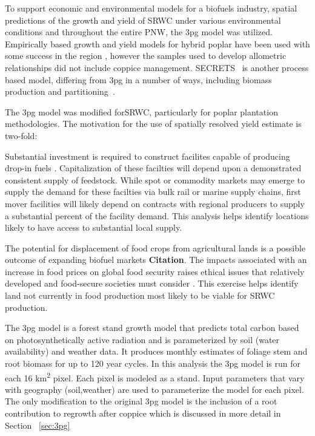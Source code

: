 \documentclass[preprint,12pt]{elsarticle}
\begin{document}
To support economic and environmental models for a biofuels industry,
spatial predictions of the growth and yield of \acf{SRWC} under
various environmental conditions and throughout the entire \acf{PNW},
the \acf{3pg}\cite{landsberg2010physiological,Landsberg1997,Sands2004}
model was utilized.  Empirically based growth and yield models for
hybrid poplar have been used with some success in the region
\cite{Clendenen1996}, however the samples used to develop allometric
 relationships did not include coppice management.
\ac{SECRETS}~\cite{Sampson2001} is another process based model,
differing from \ac{3pg} in a number of ways, including biomass
production and partitioning~\cite{SurendranNair2012}.

The \ac{3pg} model was modified for\ac{SRWC}, particularly
for poplar plantation methodologies. The motivation for the use of
spatially resolved yield estimate is two-fold:
\begin{description}
\item[Biofuels production system optimization] Substantial investment
  is required to construct facilites capable of producing drop-in
  fuels \cite{Parker2010a}. Capitalization of these facilties will
  depend upon a demonstrated
  consistent supply of feedstock. While spot or commodity markets may
  emerge to supply the demand for these facilties via bulk rail or
  marine supply chains, first mover facilities will
  likely depend on contracts with regional producers to supply a
  substantial percent of the facility demand. This analysis helps
  identify locations likely to have access to substantial local
  supply.
\item[Land use] The potential for displacement of food crops from
  agricultural lands is a possible outcome of expanding biofuel
  markets \textbf{Citation}. The impacts associated with an increase in food
  prices on global food security raises ethical issues that relatively
  developed and food-secure societies must consider
  \cite{Pimentel2008}. This exercise helps identify land not currently
  in food production most likely to be viable for \ac{SRWC} production.
\item
\end{description}

The \ac{3pg} model \cite{Landsberg1997} is a forest stand growth model
that predicts total carbon based on photosynthetically active
radiation and is parameterized by soil (water availability) and
weather data. It produces monthly estimates of foliage stem and root
biomass for up to 120 year cycles. In this analysis the \ac{3pg} model
is run for each 16 km\textsuperscript{2} pixel. Each pixel is modeled
as a stand. Input parameters that vary with geography (soil,weather)
are used to parameterize the model for each pixel. The only
modification to the original \ac{3pg} model is the inclusion of a root
contribution to regrowth after coppice which is discussed in more
detail in Section ~\ref{sec:3pg}
\end{document}
